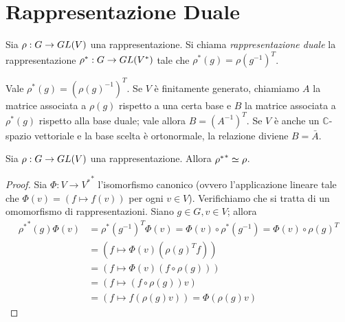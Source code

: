 \section{Rappresentazione Duale}

\begin{definition}
Sia $\rho:G\to GL(V)$ una rappresentazione. Si chiama \emph{rappresentazione duale} la rappresentazione $\rho^*:G\to GL(V^*)$ tale che $\rho^*(g)=\rho(g^{-1})^T$.

\end{definition}
\begin{remark}
Vale $\rho^*(g)=(\rho(g)^{-1})^T$. Se $V$ è finitamente generato, chiamiamo $A$ la matrice associata a $\rho(g)$ rispetto a una certa base e $B$ la matrice associata a $\rho^*(g)$ rispetto alla base duale; vale allora $B=(A^{-1})^T$. Se $V$ è anche un $\mathbb{C}$-spazio vettoriale e la base scelta è ortonormale, la relazione diviene $B=\bar{A}$.
\end{remark}

\begin{proposition}
Sia $\rho:G\to GL(V)$ una rappresentazione. Allora ${\rho^*}^*\simeq\rho$.
\end{proposition}
\begin{proof}
Sia $\Phi:V\to{V^*}^*$ l'isomorfismo canonico (ovvero l'applicazione lineare tale che $\Phi(v)=(f\mapsto f(v))$ per ogni $v\in V$). Verifichiamo che si tratta di un omomorfismo di rappresentazioni. Siano $g\in G,v\in V$; allora
\begin{align*}
{\rho^*}^*(g)\Phi(v)&=\rho^*(g^{-1})^T\Phi(v)=\Phi(v)\circ\rho^*(g^{-1})=\Phi(v)\circ\rho(g)^T\\
&=(f\mapsto\Phi(v)(\rho(g)^Tf))\\
&=(f\mapsto\Phi(v)(f\circ\rho(g)))\\
&=(f\mapsto(f\circ\rho(g))v)\\
&=(f\mapsto f(\rho(g)v))=\Phi(\rho(g)v)
\end{align*}
\end{proof}

